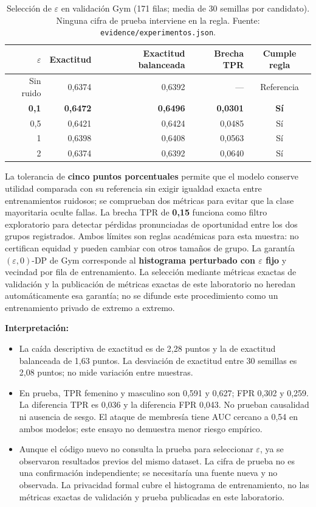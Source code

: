\documentclass[11pt]{article}
\begin{document}
\begin{table}[H]
\centering\small
\begin{tabular}{@{}rrrrc@{}}
\toprule
$\varepsilon$ & Exactitud & Exactitud balanceada & Brecha TPR & Cumple regla \\
\midrule
Sin ruido & 0,6374 & 0,6392 & --- & Referencia \\
\textbf{0,1} & \textbf{0,6472} & \textbf{0,6496} & \textbf{0,0301} & \textbf{Sí} \\
0,5 & 0,6421 & 0,6424 & 0,0485 & Sí \\
1 & 0,6398 & 0,6408 & 0,0563 & Sí \\
2 & 0,6374 & 0,6392 & 0,0640 & Sí \\
\bottomrule
\end{tabular}
\caption{Selección de $\varepsilon$ en validación Gym (171 filas; media de 30 semillas por candidato). Ninguna cifra de prueba interviene en la regla. Fuente: \texttt{evidence/experimentos.json}.}
\label{tab:gym-validacion}
\end{table}

La tolerancia de \textbf{cinco puntos porcentuales} permite que el modelo conserve utilidad comparada con su referencia sin exigir igualdad exacta entre entrenamientos ruidosos; se comprueban dos métricas para evitar que la clase mayoritaria oculte fallas. La brecha TPR de \textbf{0,15} funciona como filtro exploratorio para detectar pérdidas pronunciadas de oportunidad entre los dos grupos registrados. Ambos límites son reglas académicas para esta muestra: no certifican equidad y pueden cambiar con otros tamaños de grupo. La garantía $(\varepsilon,0)$-DP de Gym corresponde al \textbf{histograma perturbado con $\varepsilon$ fijo} y vecindad por fila de entrenamiento. La selección mediante métricas exactas de validación y la publicación de métricas exactas de este laboratorio no heredan automáticamente esa garantía; no se difunde este procedimiento como un entrenamiento privado de extremo a extremo.

\textbf{Interpretación:}
\begin{itemize}[nosep]
  \item La caída descriptiva de exactitud es de 2,28 puntos y la de exactitud balanceada de 1,63 puntos. La desviación de exactitud entre 30 semillas es 2,08 puntos; no mide variación entre muestras.
  \item En prueba, TPR femenino y masculino son 0,591 y 0,627; FPR 0,302 y 0,259. La diferencia TPR es 0,036 y la diferencia FPR 0,043. No prueban causalidad ni ausencia de sesgo. El ataque de membresía \cite{shokri2017} tiene AUC cercano a 0,54 en ambos modelos; este ensayo no demuestra menor riesgo empírico.
  \item Aunque el código nuevo no consulta la prueba para seleccionar $\varepsilon$, ya se observaron resultados previos del mismo dataset. La cifra de prueba no es una confirmación independiente; se necesitaría una fuente nueva y no observada. La privacidad formal cubre el histograma de entrenamiento, no las métricas exactas de validación y prueba publicadas en este laboratorio.
\end{itemize}
\end{document}
